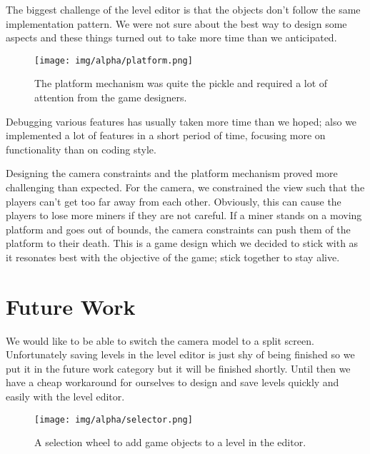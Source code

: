 The biggest challenge of the level editor is that the objects don't follow the same implementation pattern. We were not sure about the best way to design some aspects and these things turned out to take more time than we anticipated.

\begin{wrapfigure}{r}{0.5\textwidth}
  \vspace{-20pt}
  \begin{center}
    \texttt{[image: img/alpha/platform.png]}
  \end{center}
  \caption{The platform mechanism was quite the pickle and required a lot of attention from the game designers.}
\end{wrapfigure}

Debugging various features has usually taken more time than we hoped; also we implemented a lot of features in a short period of time, focusing more on functionality than on coding style.

Designing the camera constraints and the platform mechanism proved more challenging than expected. For the camera, we constrained the view such that the players can't get too far away from each other. Obviously, this can cause the players to lose more miners if they are not careful. If a miner stands on a moving platform and goes out of bounds, the camera constraints can push them of the platform to their death. This is a game design which we decided to stick with as it resonates best with the objective of the game; stick together to stay alive.

\section{Future Work}

We would like to be able to switch the camera model to a split screen. Unfortunately saving levels in the level editor is just shy of being finished so we put it in the future work category but it will be finished shortly. Until then we have a cheap workaround for ourselves to design and save levels quickly and easily with the level editor.

\begin{figure}
\centering
\texttt{[image: img/alpha/selector.png]}
\caption{A selection wheel to add game objects to a level in the editor.}
\end{figure}
